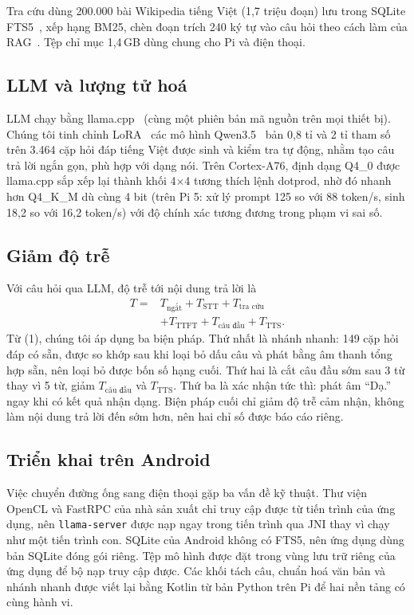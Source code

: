 \documentclass[a4paper,12pt,twocolumn]{article}
\begin{document}
Tra cứu dùng 200.000 bài Wikipedia tiếng Việt (1,7 triệu đoạn) lưu trong SQLite FTS5~\cite{fts5}, xếp hạng BM25, chèn đoạn trích 240 ký tự vào câu hỏi theo cách làm của RAG~\cite{rag}. Tệp chỉ mục 1,4\,GB dùng chung cho Pi và điện thoại.

\subsection{LLM và lượng tử hoá}
LLM chạy bằng llama.cpp~\cite{llamacpp} (cùng một phiên bản mã nguồn trên mọi thiết bị). Chúng tôi tinh chỉnh LoRA~\cite{lora} các mô hình Qwen3.5~\cite{qwen} bản 0,8 tỉ và 2 tỉ tham số trên 3.464 cặp hỏi đáp tiếng Việt được sinh và kiểm tra tự động, nhằm tạo câu trả lời ngắn gọn, phù hợp với dạng nói. Trên Cortex-A76, định dạng Q4\_0 được llama.cpp sắp xếp lại thành khối 4$\times$4 tương thích lệnh dotprod, nhờ đó nhanh hơn Q4\_K\_M dù cùng 4 bit (trên Pi 5: xử lý prompt 125 so với 88 token/s, sinh 18,2 so với 16,2 token/s) với độ chính xác tương đương trong phạm vi sai số.

\subsection{Giảm độ trễ}
Với câu hỏi qua LLM, độ trễ tới nội dung trả lời là
\begin{equation}
\begin{split}
T ={}& T_{\text{ngắt}} + T_{\text{STT}} + T_{\text{tra cứu}}\\
&+ T_{\text{TTFT}} + T_{\text{câu đầu}} + T_{\text{TTS}}.
\end{split}
\end{equation}
Từ (1), chúng tôi áp dụng ba biện pháp. Thứ nhất là nhánh nhanh: 149 cặp hỏi đáp có sẵn, được so khớp sau khi loại bỏ dấu câu và phát bằng âm thanh tổng hợp sẵn, nên loại bỏ được bốn số hạng cuối. Thứ hai là cắt câu đầu sớm sau 3 từ thay vì 5 từ, giảm $T_{\text{câu đầu}}$ và $T_{\text{TTS}}$. Thứ ba là xác nhận tức thì: phát âm ``Dạ.'' ngay khi có kết quả nhận dạng. Biện pháp cuối chỉ giảm độ trễ cảm nhận, không làm nội dung trả lời đến sớm hơn, nên hai chỉ số được báo cáo riêng.

\subsection{Triển khai trên Android}
Việc chuyển đường ống sang điện thoại gặp ba vấn đề kỹ thuật. Thư viện OpenCL và FastRPC của nhà sản xuất chỉ truy cập được từ tiến trình của ứng dụng, nên \texttt{llama-server} được nạp ngay trong tiến trình qua JNI thay vì chạy như một tiến trình con. SQLite của Android không có FTS5, nên ứng dụng dùng bản SQLite đóng gói riêng. Tệp mô hình được đặt trong vùng lưu trữ riêng của ứng dụng để bộ nạp truy cập được. Các khối tách câu, chuẩn hoá văn bản và nhánh nhanh được viết lại bằng Kotlin từ bản Python trên Pi để hai nền tảng có cùng hành vi.
\end{document}
